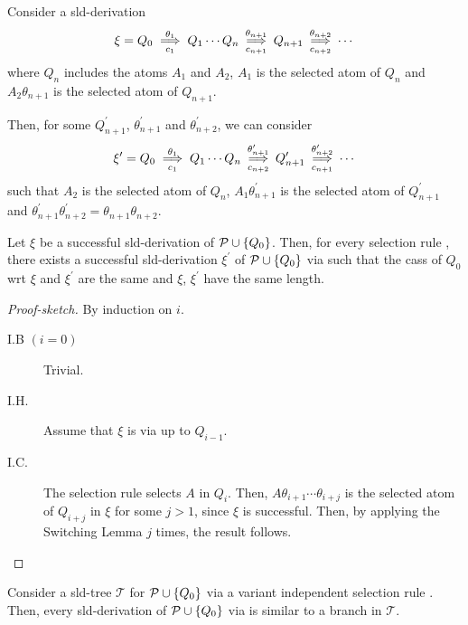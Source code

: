   \begin{lem}
      Consider a \gls{sld}-derivation
      \begin{equation*}
        \xi = Q_0 \underset{c_1}{\overset{\theta_1}{\implies}} Q_1 \dotsb Q_n
        \underset{c_{n+1}}{\overset{\theta_{n+1}}{\implies}} Q_{n+1} \underset{c_{n+2}}{\overset{\theta_{n+2}}{\implies}} \dotsb
    \end{equation*}
    where \(Q_n\) includes the atoms \(A_1\) and \(A_2\), \(A_1\) is the selected atom of \(Q_n\) and \(A_2\theta_{n+1}\) is the selected atom of \(Q_{n+1}\).

    Then, for some \(Q_{n+1}^\prime\), \(\theta_{n+1}^\prime\) and \(\theta_{n+2}^\prime\), we can consider
    \begin{equation*}
        \xi^\prime = Q_0 \underset{c_1}{\overset{\theta_1}{\implies}} Q_1 \dotsb Q_n
        \underset{c_{n+2}}{\overset{\theta_{n+1}^\prime}{\implies}} Q_{n+1}^\prime \underset{c_{n+1}}{\overset{\theta^\prime_{n+2}}{\implies}} \dotsb
    \end{equation*}
    such that \(A_2\) is the selected atom of \(Q_n\), \(A_1\theta_{n+1}^\prime\) is the selected atom of \(Q_{n+1}^\prime\) and \(\theta_{n+1}^\prime\theta_{n+2}^\prime = \theta_{n+1}\theta_{n+2}\).
  \end{lem}

  \begin{thm}
    \label{proc:thm-2}
      Let \(\xi\) be a successful \gls{sld}-derivation of \(\mathcal{P} \cup \lbrace Q_0 \rbrace\).
      Then, for every selection rule , there exists a successful \gls{sld}-derivation \(\xi^\prime\) of \(\mathcal{P} \cup \lbrace Q_0 \rbrace\) via  such that the \gls{cas}s of \(Q_0\) wrt \(\xi\) and \(\xi^\prime\) are the same and \(\xi\), \(\xi^\prime\) have the same length.
  \end{thm}
  \begin{proof}[Proof-sketch]
      By induction on \(i\).
      \begin{description}
          \item[I.B \((i = 0)\)] Trivial.
          \item[I.H.] Assume that \(\xi\) is via  up to \(Q_{i-1}\).
          \item[I.C.] The selection rule  selects \(A\) in \(Q_i\).
          Then, \(A\theta_{i+1}\dotsb\theta_{i+j}\) is the selected atom of \(Q_{i+j}\) in \(\xi\) for some \(j > 1\), since \(\xi\) is successful.
          Then, by applying the Switching Lemma \(j\) times, the result follows. 
      \end{description}
  \end{proof}

  \begin{thm}
      \label{proc:thm-3}
      Consider a \gls{sld}-tree \(\mathcal{T}\) for \(\mathcal{P} \cup \lbrace Q_0 \rbrace\) via a variant independent selection rule .
      Then, every \gls{sld}-derivation of \(\mathcal{P} \cup \lbrace Q_0 \rbrace\) via  is similar to a branch in \(\mathcal{T}\). 
  \end{thm}